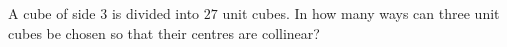 A cube of side $3$ is divided into $27$ unit cubes. In how many ways can three unit cubes be chosen so that their centres are collinear?
